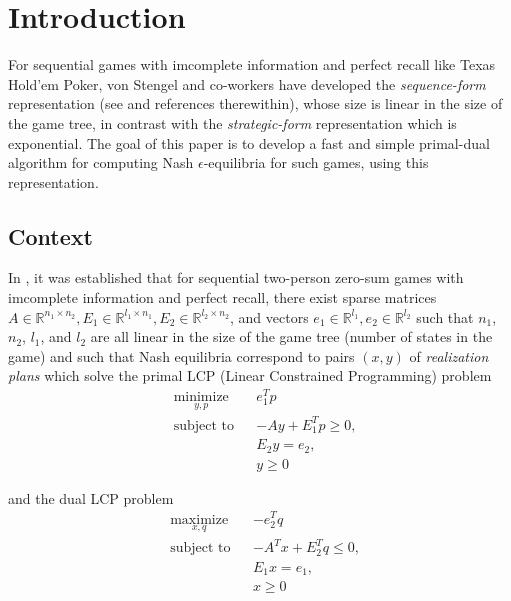 \documentclass{article} %
\begin{document}
\section{Introduction}
\label{sec:intro}
For sequential games with imcomplete information and perfect recall like Texas Hold'em Poker, von Stengel and co-workers have developed the \textit{sequence-form} representation (see \cite{von1996efficient} and references therewithin), whose size is linear in the size of the game tree, in contrast with the \textit{strategic-form} representation which is exponential. The goal of this paper is to develop a fast and simple primal-dual algorithm for computing  Nash $\epsilon$-equilibria for such games, using this representation.

\subsection{Context}
In \cite{von1996efficient, vonequilibrium}, it was established that for sequential two-person zero-sum games with imcomplete information and perfect recall, there exist sparse matrices $A \in \mathbb{R}^{n_1 \times n_2}, E_1 \in \mathbb{R}^{l_1 \times n_1}, E_2 \in \mathbb{R}^{l_2 \times n_2}$, and vectors $e_1 \in \mathbb{R}^{l_1}, e_2 \in \mathbb{R}^{l_2}$ such that $n_1$, $n_2$, $l_1$, and $l_2$ are all linear in the size of the game tree (number of states in the game) and such that Nash equilibria correspond to pairs $(x, y)$ of \textit{realization plans} which solve the primal LCP (Linear Constrained Programming) problem
\begin{equation}
  \begin{aligned}
    & \underset{y,p}{\text{minimize}}
    & & e_1^Tp \\
    & \text{subject to}
    & & -Ay + E_1^Tp \geq 0,\\
    &&& E_2y = e_2,\\
    &&& y \ge 0
  \end{aligned}
  \label{eq:primal_pb}
\end{equation}

and the dual LCP problem
\begin{equation}
  \begin{aligned}
    & \underset{x,q}{\text{maximize}}
    & & -e_2^Tq \\
    & \text{subject to}
    & & -A^Tx + E_2^Tq \leq 0,\\
    &&& E_1x = e_1,\\
    &&& x \ge 0
  \end{aligned}
  \label{eq:dual_pb}
\end{equation}
\end{document}
